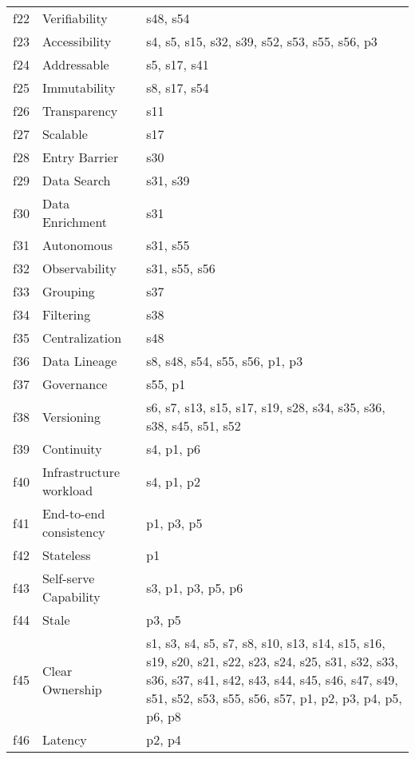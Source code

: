 \begin{tabular}{|c|p{}|p{}|}
f22 & Verifiability & \cellcolor{emerald_shape_1} {s48, s54}\\
f23 & Accessibility & \cellcolor{emerald_shape_4} {s4, s5, s15, s32, s39, s52, s53, s55, s56, p3}\\
f24 & Addressable & \cellcolor{emerald_shape_2} {s5, s17, s41}\\
f25 & Immutability & \cellcolor{emerald_shape_2} {s8, s17, s54}\\
f26 & Transparency & \cellcolor{emerald_shape_1} {s11}\\
f27 & Scalable & \cellcolor{emerald_shape_1} {s17}\\
f28 & Entry Barrier & \cellcolor{emerald_shape_1} {s30}\\
f29 & Data Search & \cellcolor{emerald_shape_1} {s31, s39}\\
f30 & Data Enrichment & \cellcolor{emerald_shape_1} {s31}\\
f31 & Autonomous & \cellcolor{emerald_shape_1} {s31, s55}\\
f32 & Observability & \cellcolor{emerald_shape_2} {s31, s55, s56}\\
f33 & Grouping & \cellcolor{emerald_shape_1} {s37}\\
f34 & Filtering & \cellcolor{emerald_shape_1} {s38}\\
f35 & Centralization & \cellcolor{emerald_shape_1} {s48}\\
f36 & Data Lineage & \cellcolor{emerald_shape_3} {s8, s48, s54, s55, s56, p1, p3}\\
f37 & Governance & \cellcolor{emerald_shape_1} {s55, p1}\\
f38 & Versioning & \cellcolor{emerald_shape_4} {s6, s7, s13, s15, s17, s19, s28, s34, s35, s36, s38, s45, s51, s52}\\
f39 & Continuity & \cellcolor{emerald_shape_2} {s4, p1, p6}\\
f40 & Infrastructure workload & \cellcolor{emerald_shape_2} {s4, p1, p2}\\
f41 & End-to-end consistency & \cellcolor{emerald_shape_2} {p1, p3, p5}\\
f42 & Stateless & \cellcolor{emerald_shape_1} {p1}\\
f43 & Self-serve Capability & \cellcolor{emerald_shape_3} {s3, p1, p3, p5, p6}\\
f44 & Stale & \cellcolor{emerald_shape_1} {p3, p5}\\
f45 & Clear Ownership & \cellcolor{emerald_shape_7} {s1, s3, s4, s5, s7, s8, s10, s13, s14, s15, s16, s19, s20, s21, s22, s23, s24, s25, s31, s32, s33, s36, s37, s41, s42, s43, s44, s45, s46, s47, s49, s51, s52, s53, s55, s56, s57, p1, p2, p3, p4, p5, p6, p8}\\
f46 & Latency & \cellcolor{emerald_shape_1} {p2, p4}\\
\hline
\end{tabular}
